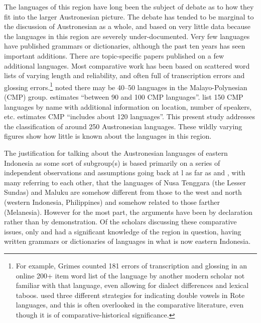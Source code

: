 The languages of this region have long been the subject of debate as to how they fit into the larger Austronesian picture.
The debate has tended to be marginal to the discussion of Austronesian as a whole,
and based on very little data because the languages in this region are severely under-documented.
Very few languages have published grammars or dictionaries,
although the past ten years has seen important additions.
There are topic-specific papers published on a few additional languages.
Most comparative work has been based on scattered word lists of varying length
and reliability, and often full of transcription errors
and glossing errors.\footnote{For example,
		Grimes counted 181 errors of transcription
		and glossing in an online 200+ item word list of the  language
		by another modern scholar not familiar with that language,
		even allowing for dialect differences and lexical taboos.
		\citet{Jonker1908,Jonker1915} used three different strategies for indicating double vowels in Rote languages,
		and this is often overlooked in the comparative literature,
		even though it is of comparative-historical significance.}
\citet{Clark1987} noted there may be 40--50 languages in the  Malayo-Polynesian (CMP) group.
\citet[288]{Blust1993} estimates “between 90 and 100 CMP languages”.
\citet{Grimes1995} list 150 CMP languages by name with additional information on location,
number of speakers, etc.
\citet[32]{Blust2013} estimates CMP “includes about 120 languages”.
This present study addresses the classification of around 250 Austronesian languages.
These wildly varying figures show how little is known about the languages in this region.

The justification for talking about the Austronesian languages of eastern Indonesia
as some sort of subgroup(s) is based primarily on a series of independent observations
and assumptions going back at l as far as
\citet{Brandes1884,Friederici1913,Jonker1914,Esser1938} and \citet{Salzner1960},
with many referring to each other,
that the languages of Nusa Tenggara (the Lesser Sundas)
and Maluku are somehow different from those to the west
and north (western Indonesia,
Philippines)
and somehow related to those farther  (Melanesia).
However for the most part,
the arguments have been by declaration rather than by demonstration.
Of the scholars discussing these comparative issues,
only \citet{Jonker1908,Jonker1913,Jonker1915,Jonker1932}
and \citet{Stresemann1918,Stresemann1927} had a significant knowledge of the region in question,
having written grammars or dictionaries of languages in what is now eastern Indonesia.

